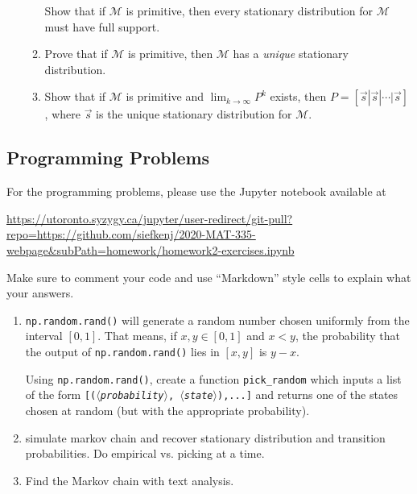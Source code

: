 \documentclass[letter]{article}
\newcommand{\var}[1]{{$\langle$\it #1$\rangle$}}
\begin{document}
\begin{enumerate}
\begin{enumerate}
				\smallskip
				Show that if $\mathcal M$ is primitive, then every stationary distribution for $\mathcal M$
				must have full support.
			\item Prove that if $\mathcal M$ is primitive, then $\mathcal M$ has a \emph{unique} stationary distribution.
			\item Show that if $\mathcal M$ is primitive and $\lim_{k\to\infty} P^k$ exists, then $P=[\vec s|\vec s|\cdots|\vec s]$,
				where $\vec s$ is the unique stationary distribution for $\mathcal M$.
		\end{enumerate}


	\end{enumerate}


	\subsection*{Programming Problems}
	For the programming problems, please use the Jupyter notebook available at

	\url{https://utoronto.syzygy.ca/jupyter/user-redirect/git-pull?repo=https://github.com/siefkenj/2020-MAT-335-webpage&subPath=homework/homework2-exercises.ipynb}

	Make sure to comment your code and use ``Markdown'' style cells to explain what your answers.

	\begin{enumerate}
		\item {\tt np.random.rand()} will generate a random number chosen uniformly from the interval $[0,1]$. That
			means, if $x,y\in [0,1]$ and $x<y$, the probability that the output of {\tt np.random.rand()} lies in $[x,y]$
			is $y-x$.

			Using {\tt np.random.rand()}, create a function \verb|pick_random| which inputs a list of the form
			{\tt [(\var{probability}, \var{state}),...]} and returns one of the states chosen at random (but with 
			the appropriate probability).

		\item simulate markov chain and recover stationary distribution and transition probabilities. Do empirical vs. picking at a time.
		\item Find the Markov chain with text analysis.
	\end{enumerate}
\end{document}
